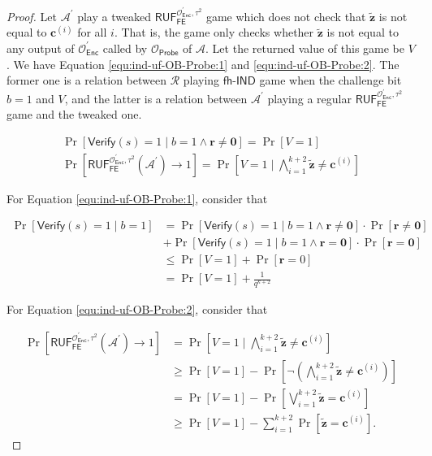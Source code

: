\begin{proof}
Let $\mathcal{A}^\prime$ play a tweaked $\textsf{RUF}_\textsf{FE}^{\mathcal{O}^\prime_{\textsf{Enc}}, \tau^2}$ game which does not check that $\mathbf{\tilde{z}}$ is not equal to $\mathbf{c}^{(i)}$ for all $i$. That is, the game only checks whether $\mathbf{\tilde{z}}$ is not equal to any output of $\mathcal{O}^\prime_\textsf{Enc}$ called by $\mathcal{O}_\textsf{Probe}$ of $\mathcal{A}$. Let the returned value of this game be $V$. We have Equation \ref{equ:ind-uf-OB-Probe:1} and \ref{equ:ind-uf-OB-Probe:2}. The former one is a relation between $\mathcal{R}$ playing $\textsf{fh-IND}$ game when the challenge bit $b=1$ and $V$, and the latter is a relation between $\mathcal{A}^\prime$ playing a regular $\textsf{RUF}_\textsf{FE}^{\mathcal{O}^\prime_{\textsf{Enc}}, \tau^2}$ game and the tweaked one.

\begin{gather}
	\Pr[\textsf{Verify}(s) = 1 \mid b = 1 \wedge \mathbf{r} \neq \mathbf{0}] = \Pr[V = 1] \label{equ:ind-uf-OB-Probe:1} \\
	\Pr[\textsf{RUF}_\textsf{FE}^{\mathcal{O}^\prime_{\textsf{Enc}}, \tau^2}(\mathcal{A}^\prime) \to 1] = \Pr\left[ V = 1 \mid \bigwedge_{i=1}^{k+2} \mathbf{\tilde{z}} \neq \mathbf{c}^{(i)} \right] \label{equ:ind-uf-OB-Probe:2}
\end{gather}

\noindent For Equation \ref{equ:ind-uf-OB-Probe:1}, consider that

\begin{align*}
	\Pr[\textsf{Verify}(s) = 1 \mid b = 1]
	&= \Pr[\textsf{Verify}(s) = 1 \mid b = 1 \wedge \mathbf{r} \neq \mathbf{0}] \cdot \Pr[\mathbf{r} \neq \mathbf{0}] \\
	&+ \Pr[\textsf{Verify}(s) = 1 \mid b = 1 \wedge \mathbf{r} = \mathbf{0}] \cdot \Pr[\mathbf{r} = \mathbf{0}] \\
	&\leq \Pr[V = 1] + \Pr[\mathbf{r} = 0] \\
	&= \Pr[V = 1] + \frac{1}{q^{k+2}} 
\end{align*}

\noindent For Equation \ref{equ:ind-uf-OB-Probe:2}, consider that

\begin{align*}
	\Pr[\textsf{RUF}_\textsf{FE}^{\mathcal{O}^\prime_{\textsf{Enc}}, \tau^2}(\mathcal{A}^\prime) \to 1] 
	&= \Pr\left[ V = 1 \mid \bigwedge_{i=1}^{k+2} \mathbf{\tilde{z}} \neq \mathbf{c}^{(i)} \right] \\ 
	& \geq \Pr[V = 1] - \Pr \left[ \neg  \left( \bigwedge_{i=1}^{k+2} \mathbf{\tilde{z}} \neq \mathbf{c}^{(i)} \right) \right] \\
	& = \Pr[V = 1] - \Pr \left[ \bigvee_{i=1}^{k+2} \mathbf{\tilde{z}} = \mathbf{c}^{(i)} \right] \\
	& \geq \Pr[V = 1] - \sum_{i=1}^{k+2} \Pr[\mathbf{\tilde{z}} = \mathbf{c}^{(i)}].
\end{align*}


\end{proof}
